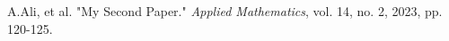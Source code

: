 \documentclass[11pt]{article}
\begin{document}
\noindent
A.Ali, et al. "My Second Paper." \textit{Applied Mathematics}, vol. 14, no. 2, 2023, pp. 120-125.
\end{document}
